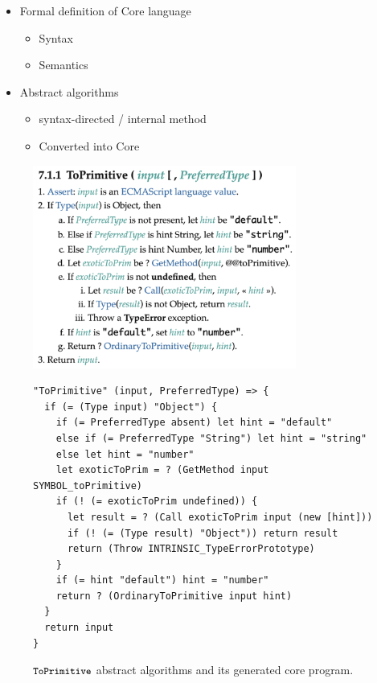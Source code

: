 {\begin{itemize}
  \item Formal definition of Core language
    \begin{itemize}
      \item Syntax
      \item Semantics
    \end{itemize}
  \item Abstract algorithms
    \begin{itemize}
      \item syntax-directed / internal method
      \item Converted into Core
    \end{itemize}
\end{itemize}
}

\begin{figure}
  \centering
  \includegraphics[height=18em]{img/to_primitive.png}
  \begin{lstlisting}[style=myCorestyle]
"ToPrimitive" (input, PreferredType) => {
  if (= (Type input) "Object") {
    if (= PreferredType absent) let hint = "default"
    else if (= PreferredType "String") let hint = "string"
    else let hint = "number"
    let exoticToPrim = ? (GetMethod input SYMBOL_toPrimitive)
    if (! (= exoticToPrim undefined)) {
      let result = ? (Call exoticToPrim input (new [hint]))
      if (! (= (Type result) "Object")) return result
      return (Throw INTRINSIC_TypeErrorPrototype)
    }
    if (= hint "default") hint = "number"
    return ? (OrdinaryToPrimitive input hint)
  }
  return input
}
  \end{lstlisting}
  \caption{\( \texttt{\small ToPrimitive} \) abstract algorithms
  and its generated core program.}
  \label{fig:to-primitive}
\end{figure}

